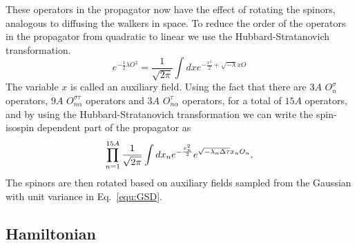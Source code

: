 These operators in the propagator now have the effect of rotating the spinors, analogous to diffusing the walkers in space. To reduce the order of the operators in the propagator from quadratic to linear we use the Hubbard-Stratanovich transformation.
\begin{equation}
   e^{-\frac{1}{2}\lambda O^2} = \frac{1}{\sqrt{2\pi}} \int dx e^{-\frac{x^2}{2} + \sqrt{-\lambda}x O}
\end{equation}
The variable $x$ is called an auxiliary field. Using the fact that there are $3A$ $O_{n}^{\sigma}$ operators, $9A$ $O_{n\alpha}^{\sigma\tau}$ operators and $3A$ $O_{n\alpha}^{\tau}$ operators, for a total of $15A$ operators, and by using the Hubbard-Stratanovich transformation we can write the spin-isospin dependent part of the propagator as
\begin{equation}
   \prod\limits_{n=1}^{15A}\frac{1}{\sqrt{2\pi}}\int dx_n e^{-\frac{x_n^2}{2}}e^{\sqrt{-\lambda_n\Delta\tau} x_nO_n}.
   \label{equ:GSD}
\end{equation}
The spinors are then rotated based on auxiliary fields sampled from the Gaussian with unit variance in Eq.~\ref{equ:GSD}.

\subsubsection{}

\subsection{Hamiltonian}
